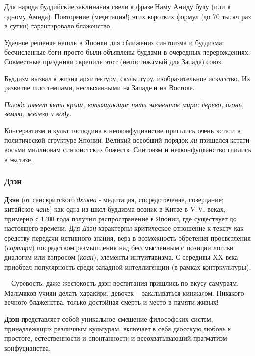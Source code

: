 \documentclass[a4paper]{article}
\begin{document}
{
Для народа буддийские заклинания свели к фразе {\textquotedbl}Наму Амиду буцу{\textquotedbl} (или к одному
{\textquotedbl}Амида{\textquotedbl}). Повторение (медитация!) этих коротких формул (до 70 тысяч раз в сутки)
гарантировало блаженство.}

{
Удачное решение нашли в Японии для сближения синтоизма и буддизма: бесчисленные боги просто были объявлены буддами в
очередных перерождениях. Совместные праздники скрепили этот (непостижимый для Запада) союз.}

{
Буддизм вызвал к жизни архитектуру, скульптуру, изобразительное искусство. Их развитие шло темпами, неслыханными на
Западе и на Востоке. }

{\itshape
Пагода имеет пять крыш, воплощающих пять элементов мира: дерево, огонь, землю, железо и воду.}

{
Консерватизм и культ господина в неоконфуцианстве пришлись очень кстати в политической структуре Японии. Великий
всеобщий порядок \textit{ли} пришелся кстати восьми миллионам синтоистских божеств. Синтоизм и неоконфуцианство
{\textquotedbl}слились в экстазе{\textquotedbl}. }

\subsubsection{Дзэн}
{
\textbf{Дзэн} (от санскритского \textit{дхьяна} - медитация, сосредоточение, созерцание; китайское \textit{чань}) как
одна из школ буддизма возник в Китае в \foreignlanguage{english}{V}{}-\foreignlanguage{english}{VI} веках, примерно с
1200 года получил распространение в Японии, где существует до настоящего времени. Для \textit{Дзэн} характерны
критическое отношение к тексту как средству передачи истинного знания, вера в возможность обретения
{\textquotedbl}просветления{\textquotedbl} (\textit{сартори}) посредством размышления над бессмысленным с позиции
логики диалогом или вопросом (\textit{коан}), элементы интуитивизма. С середины \foreignlanguage{english}{XX} века
приобрел популярность среди западной интеллигенции (в рамках контркультуры).}

{
\ \ Суровость, даже жестокость дзэн-воспитания пришлись по вкусу самураям. Мальчиков учили делать харакири, девочек –
закалываться кинжалом. Никакого вечного блаженства, только достойная смерть и место в памяти живых! }

{
\textbf{Дзэн} представляет собой уникальное смешение философских систем, принадлежащих различным культурам, включает в
себя даосскую любовь к простоте, естественности и спонтанности и всеохватывающий прагматизм конфуцианства. }
\end{document}
